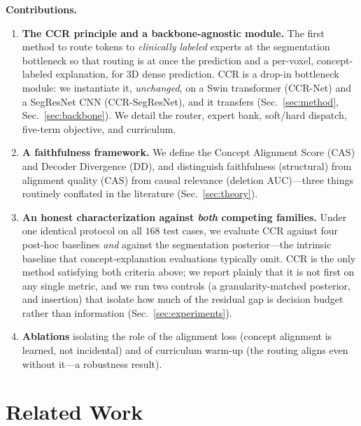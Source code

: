 \documentclass[runningheads]{llncs}
\begin{document}
\noindent\textbf{Contributions.}
\begin{enumerate}
\item \textbf{The CCR principle and a backbone-agnostic module.} The first method to route
tokens to \emph{clinically labeled} experts at the segmentation bottleneck so that routing is at
once the prediction and a per-voxel, concept-labeled explanation, for 3D dense prediction. CCR
is a drop-in bottleneck module: we instantiate it, \emph{unchanged}, on a Swin transformer
(CCR-Net) and a SegResNet CNN (CCR-SegResNet), and it transfers (Sec.~\ref{sec:method},
Sec.~\ref{sec:backbone}). We detail the router, expert bank, soft/hard dispatch, five-term
objective, and curriculum.
\item \textbf{A faithfulness framework.} We define the Concept Alignment Score (CAS) and Decoder
Divergence (DD), and distinguish faithfulness (structural) from alignment quality (CAS) from
causal relevance (deletion AUC)---three things routinely conflated in the literature
(Sec.~\ref{sec:theory}).
\item \textbf{An honest characterization against \emph{both} competing families.} Under one
identical protocol on all $168$ test cases, we evaluate CCR against four post-hoc baselines
\emph{and} against the segmentation posterior---the intrinsic baseline that concept-explanation
evaluations typically omit. CCR is the only method satisfying both criteria above; we report
plainly that it is not first on any single metric, and we run two controls (a granularity-matched
posterior, and insertion) that isolate how much of the residual gap is decision budget rather than
information (Sec.~\ref{sec:experiments}).
\item \textbf{Ablations} isolating the role of the alignment loss (concept alignment is
learned, not incidental) and of curriculum warm-up (the routing aligns even without it---a
robustness result).
\end{enumerate}

\section{Related Work}
\end{document}
